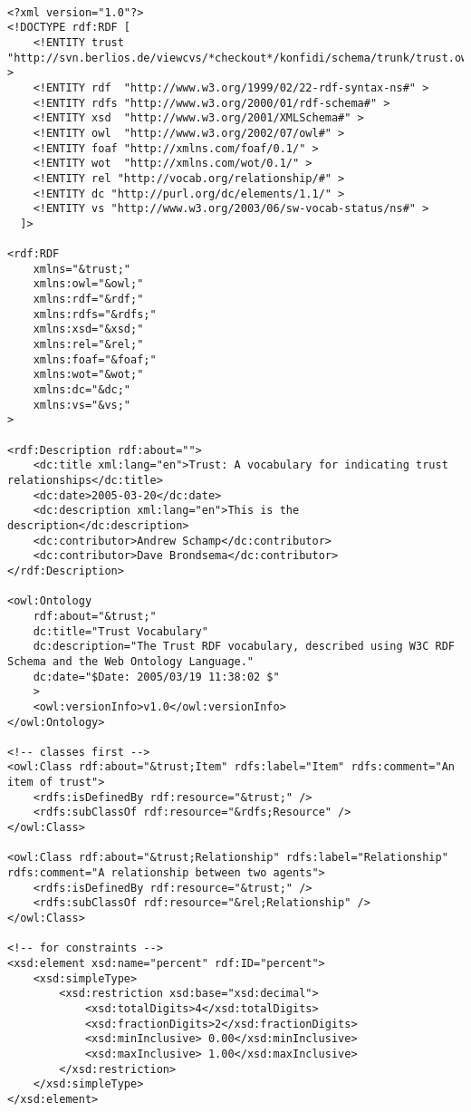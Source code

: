 \documentclass[onecolumn]{acm_proc_article-sp}
\begin{document}
\begin{verbatim}

<?xml version="1.0"?>
<!DOCTYPE rdf:RDF [
    <!ENTITY trust "http://svn.berlios.de/viewcvs/*checkout*/konfidi/schema/trunk/trust.owl#" >
    <!ENTITY rdf  "http://www.w3.org/1999/02/22-rdf-syntax-ns#" >
    <!ENTITY rdfs "http://www.w3.org/2000/01/rdf-schema#" >
    <!ENTITY xsd  "http://www.w3.org/2001/XMLSchema#" >
    <!ENTITY owl  "http://www.w3.org/2002/07/owl#" >
    <!ENTITY foaf "http://xmlns.com/foaf/0.1/" >
    <!ENTITY wot  "http://xmlns.com/wot/0.1/" >
    <!ENTITY rel "http://vocab.org/relationship/#" >
    <!ENTITY dc "http://purl.org/dc/elements/1.1/" >
    <!ENTITY vs "http://www.w3.org/2003/06/sw-vocab-status/ns#" >
  ]>

<rdf:RDF 
    xmlns="&trust;"
    xmlns:owl="&owl;" 
    xmlns:rdf="&rdf;" 
    xmlns:rdfs="&rdfs;"
    xmlns:xsd="&xsd;"
    xmlns:rel="&rel;"
    xmlns:foaf="&foaf;"
    xmlns:wot="&wot;"
    xmlns:dc="&dc;"
    xmlns:vs="&vs;"
>

<rdf:Description rdf:about="">
    <dc:title xml:lang="en">Trust: A vocabulary for indicating trust relationships</dc:title>
    <dc:date>2005-03-20</dc:date>
    <dc:description xml:lang="en">This is the description</dc:description>
    <dc:contributor>Andrew Schamp</dc:contributor>
    <dc:contributor>Dave Brondsema</dc:contributor>
</rdf:Description>

<owl:Ontology 
    rdf:about="&trust;" 
    dc:title="Trust Vocabulary" 
    dc:description="The Trust RDF vocabulary, described using W3C RDF Schema and the Web Ontology Language." 
    dc:date="$Date: 2005/03/19 11:38:02 $"
    > 
    <owl:versionInfo>v1.0</owl:versionInfo>
</owl:Ontology>

<!-- classes first -->
<owl:Class rdf:about="&trust;Item" rdfs:label="Item" rdfs:comment="An item of trust">
    <rdfs:isDefinedBy rdf:resource="&trust;" />
    <rdfs:subClassOf rdf:resource="&rdfs;Resource" />
</owl:Class>

<owl:Class rdf:about="&trust;Relationship" rdfs:label="Relationship" rdfs:comment="A relationship between two agents">
    <rdfs:isDefinedBy rdf:resource="&trust;" />
    <rdfs:subClassOf rdf:resource="&rel;Relationship" />
</owl:Class>

<!-- for constraints -->
<xsd:element xsd:name="percent" rdf:ID="percent">
    <xsd:simpleType>
        <xsd:restriction xsd:base="xsd:decimal">
            <xsd:totalDigits>4</xsd:totalDigits>
            <xsd:fractionDigits>2</xsd:fractionDigits>
            <xsd:minInclusive> 0.00</xsd:minInclusive>
            <xsd:maxInclusive> 1.00</xsd:maxInclusive>
        </xsd:restriction>
    </xsd:simpleType>
</xsd:element>


\end{verbatim}
\end{document}
